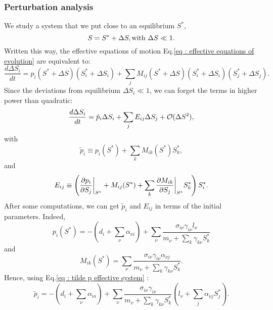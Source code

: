\documentclass[12pt]{report}
\begin{document}
\subsubsection{Perturbation analysis}
We study a system that we put close to an equilibrium $S^*$, \ie
\begin{equation}
S=S^*+\Delta S, \\ \text{with } \Delta S \ll 1.
\end{equation}
Written this way, the effective equations of motion Eq.\eqref{eq : effective equations of evolution} are equivalent to:
\begin{equation}
\frac{d\Delta S_i}{dt} = p_i(S^*+\Delta S)\left(S^*_i + \Delta S_i\right)+\sum_j M_{ij}(S^*+\Delta S)\left(S^*_i +\Delta S_i\right)\left(S^*_j +\Delta S_j\right).
\end{equation}
Since the deviations from equilibrium $\Delta S_i \ll 1$, we can forget the terms in higher power than quadratic:
\begin{equation}
\frac{d\Delta S_i}{dt} = \tilde{p}_i \Delta S_i + \sum_j E_{ij} \Delta S_j + \mathcal{O}(\Delta S^2),\label{eq : effective equ evol at O(D2)}
\end{equation}
with
\begin{equation}
\tilde{p}_i \equiv p_i(S^*) + \sum_k M_{ik}(S^*)S_k^*, \label{eq : tilde p effective system}
\end{equation}
and
\begin{equation}
E_{ij} \equiv \left(\dfrac{\partial p_i}{\partial S_j}\bigg\rvert_{S^*}+M_{ij}(S^*)+\sum_k \dfrac{\partial M_{ik}}{\partial S_j}\bigg\rvert_{S^*}S^*_k\right)S^*_i.
\end{equation}
After some computations, we can get $\tilde{p}_i$ and $E_{ij}$ in terms of the initial parameters. Indeed,
\begin{equation}
p_i(S^*)= -\left(d_i + \sum_\nu \alpha_{\nu i}\right) + \sum_\nu \frac{\sigma_{i\nu}\gamma_{i\nu}l_\nu}{m_\nu + \sum_k \gamma_{k\nu}S^*_k}
\end{equation}
and
\begin{equation}
M_{ik}(S^*) = \sum_\nu \frac{\sigma_{i\nu}\gamma_{i\nu}\alpha_{\nu j}}{m_\nu + \sum_k \gamma_{k\nu}S^*_k}.
\end{equation}
Hence, using Eq.\eqref{eq : tilde p effective system} :
\begin{equation}
\tilde{p}_i = - \left(d_i + \sum_\nu \alpha_{\nu i}\right) + \sum_\nu \frac{\sigma_{i\nu}\gamma_{i\nu}}{m_\nu + \sum_k \gamma_{k\nu}S^*_k}\left(l_\nu+\sum_{j}\alpha_{\nu j} S^*_j\right).
\end{equation}
\end{document}
